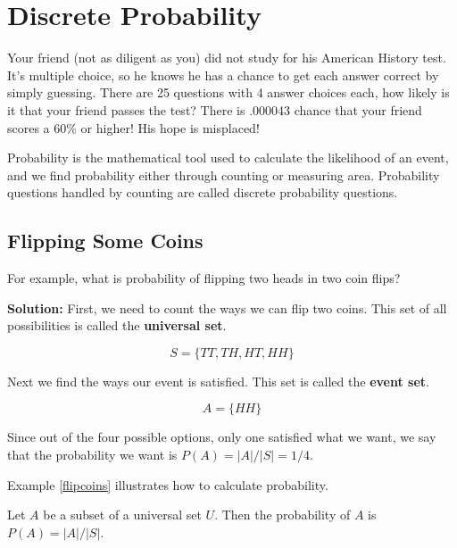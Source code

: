 
\section{Discrete Probability}

Your friend (not as diligent as you) did not study for his American History test. It's multiple choice, so he knows he has a chance to get each answer correct by simply guessing. There are 25 questions with 4 answer choices each, how likely is it that your friend passes the test? There is .000043 chance that your friend scores a 60\% or higher! His hope is misplaced!

\noindent Probability is the mathematical tool used to calculate the likelihood of an event, and we find probability either through counting or measuring area. Probability questions handled by counting are called discrete probability questions.

\subsection{Flipping Some Coins}

\begin{example}\label{flipcoins}
For example, what is probability of flipping two heads in two coin flips? 

\noindent \textbf{Solution:} First, we need to count the ways we can flip two coins. This set of all possibilities is called the \textbf{universal set}.


\begin{equation}
    S = \{TT, TH, HT, HH\}
\end{equation}

\noindent Next we find the ways our event is satisfied. This set is called the \textbf{event set}.

\begin{equation}
A = \{HH\}    
\end{equation}

\noindent Since out of the four possible options, only one satisfied what we want, we say that the probability we want is $P(A) = |A| / |S| = 1/4$.
\end{example}

\noindent Example \ref{flipcoins} illustrates how to calculate probability.

\begin{definition}
Let $A$ be a subset of a universal set $U$. Then the probability of $A$ is $P(A) = |A|/|S|$.
\end{definition}

